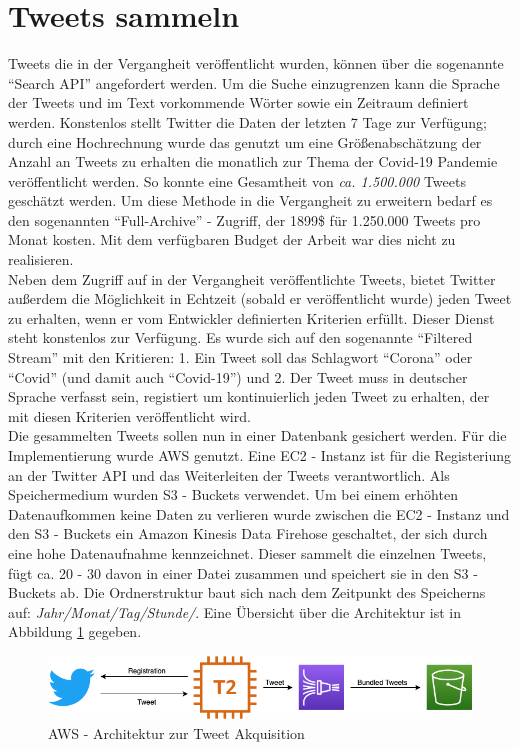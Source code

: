 \section{Tweets sammeln}
\label{sec:tweets-sammeln}
Tweets die in der Vergangheit veröffentlicht wurden, können über die sogenannte "`Search API"' angefordert werden. Um die Suche einzugrenzen kann die Sprache der Tweets und im Text vorkommende Wörter sowie ein Zeitraum definiert werden. 
Konstenlos stellt Twitter die Daten der letzten 7 Tage zur Verfügung; durch eine Hochrechnung wurde das genutzt um eine Größenabschätzung der Anzahl an Tweets zu erhalten die monatlich zur Thema der Covid-19 Pandemie veröffentlicht werden.
So konnte eine Gesamtheit von \textit{ca. 1.500.000} Tweets geschätzt werden. 
Um diese Methode in die Vergangheit zu erweitern bedarf es den sogenannten "`Full-Archive"' - Zugriff, der 1899\$ für 1.250.000 Tweets pro Monat kosten. Mit dem verfügbaren Budget der Arbeit war dies nicht zu realisieren.\\ \newline
Neben dem Zugriff auf in der Vergangheit veröffentlichte Tweets, bietet Twitter außerdem die Möglichkeit in Echtzeit (sobald er veröffentlicht wurde) jeden Tweet zu erhalten, wenn er vom Entwickler definierten Kriterien erfüllt.
Dieser Dienst steht konstenlos zur Verfügung.
Es wurde sich auf den sogenannte "`Filtered Stream"' mit den Kritieren: 1. Ein Tweet soll das Schlagwort "`Corona"' oder "`Covid"' (und damit auch "`Covid-19"') und 2. Der Tweet muss in deutscher Sprache verfasst sein, registiert um kontinuierlich jeden Tweet zu erhalten, der mit diesen Kriterien veröffentlicht wird. \\
Die gesammelten Tweets sollen nun in einer Datenbank gesichert werden. 
Für die Implementierung wurde \ac{AWS} genutzt. Eine \gls{EC2 - Instanz} ist für die Registeriung an der Twitter API und das Weiterleiten der Tweets verantwortlich. Als Speichermedium wurden \glspl{S3 - Bucket} verwendet. Um bei einem erhöhten Datenaufkommen keine Daten zu verlieren wurde zwischen die \gls{EC2 - Instanz} und den \glspl{S3 - Bucket} ein \gls{Amazon Kinesis Data Firehose} geschaltet, der sich durch eine hohe Datenaufnahme kennzeichnet. 
Dieser sammelt die einzelnen Tweets, fügt ca. 20 - 30 davon in einer Datei zusammen und speichert sie in den \glspl{S3 - Bucket} ab. 
Die Ordnerstruktur baut sich nach dem Zeitpunkt des Speicherns auf: \textit{Jahr/Monat/Tag/Stunde/}.
Eine Übersicht über die Architektur ist in Abbildung \ref{fig:aws-architecture} gegeben.
\begin{figure}[h]
	\centering
	\includegraphics[width=0.7\linewidth]{images/AWS-architecture}
	\caption{\ac{AWS} - Architektur zur Tweet Akquisition}
	\label{fig:aws-architecture}
\end{figure}

